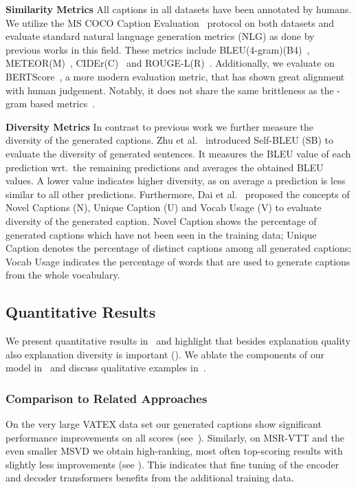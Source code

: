 \documentclass[runningheads,table]{llncs}
\begin{document}
\noindent \textbf{Similarity Metrics} All captions in all datasets have been annotated by humans. We utilize the MS COCO Caption Evaluation~\cite{chen2015microsoft} protocol on both datasets and evaluate standard natural language generation metrics (NLG) as done by previous works in this field. These metrics include BLEU(4-gram)(B4)~\cite{papineni2002bleu}, METEOR(M)~\cite{banerjee2005meteor}, CIDEr(C)~\cite{vedantam2015cider} and ROUGE-L(R)~\cite{lin2004rouge}.
Additionally, we evaluate on BERTScore~\cite{bert-score}, a more modern evaluation metric, that has shown great alignment with human judgement. Notably, it does not share the same brittleness as the -gram based metrics~\cite{papineni2002bleu}.



\noindent \textbf{Diversity Metrics} In contrast to previous work we further measure the diversity of the generated captions.
Zhu et al.\ \cite{zhu2018texygen} introduced Self-BLEU (SB) to evaluate the diversity of generated sentences.
It measures the BLEU value of each prediction wrt.\ the remaining predictions and averages the obtained BLEU values.
A lower value indicates higher diversity, as on average a prediction is less similar to all other predictions.
Furthermore, Dai et al.\ \cite{dai2018neural} proposed the concepts of Novel Captions (N), Unique Caption (U) and Vocab Usage (V) to evaluate diversity of the generated caption.
Novel Caption shows the percentage of generated captions which have not been seen in the training data;
Unique Caption denotes the percentage of distinct captions among all generated captions;
Vocab Usage indicates the percentage of words that are used to generate captions from the whole vocabulary.





\subsection{Quantitative Results}
We present quantitative results in~ and highlight that besides explanation quality also explanation diversity is important (). We ablate the components of our model in~ and discuss qualitative examples in~.


\subsubsection{Comparison to Related Approaches}
On the very large VATEX data set our generated captions show significant performance improvements on all scores (see~). Similarly, on MSR-VTT and the even smaller MSVD we obtain high-ranking, most often top-scoring results with slightly less improvements (see ). This indicates that fine tuning of the encoder and decoder transformers benefits from the additional training data. 
\end{document}
